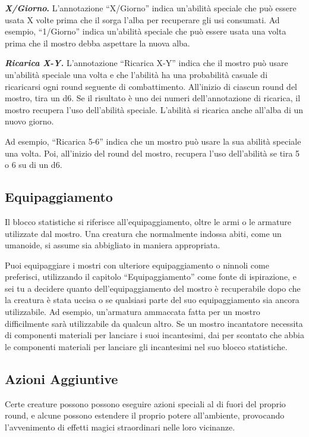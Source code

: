 \textbf{\emph{X/Giorno}.} L'annotazione ``X/Giorno'' indica un'abilità speciale che può essere usata X volte prima che il sorga l'alba per recuperare gli usi consumati. Ad esempio, ``1/Giorno'' indica un'abilità speciale che può essere usata una volta prima che il mostro debba aspettare la nuova alba.

\emph{\textbf{Ricarica X-Y.}} L'annotazione ``Ricarica X-Y'' indica che il mostro può usare un'abilità speciale una volta e che l'abilità ha una probabilità casuale di ricaricarsi ogni round seguente di combattimento. All'inizio di ciascun round del mostro, tira un d6. Se il risultato è uno dei numeri dell'annotazione di ricarica, il mostro recupera l'uso dell'abilità speciale. L'abilità si ricarica anche all'alba di un nuovo giorno.

Ad esempio, ``Ricarica 5-6'' indica che un mostro può usare la sua abilità speciale una volta. Poi, all'inizio del round del mostro, recupera l'uso dell'abilità se tira 5 o 6 su di un d6.

\subsection{Equipaggiamento}

Il blocco statistiche si riferisce all'equipaggiamento, oltre le armi o
le armature utilizzate dal mostro. Una creatura che normalmente indossa
abiti, come un umanoide, si assume sia abbigliato in maniera
appropriata.

Puoi equipaggiare i mostri con ulteriore equipaggiamento o ninnoli come
preferisci, utilizzando il capitolo ``Equipaggiamento'' come fonte di
ispirazione, e sei tu a decidere quanto dell'equipaggiamento del mostro
è recuperabile dopo che la creatura è stata uccisa o se qualsiasi parte
del suo equipaggiamento sia ancora utilizzabile. Ad esempio, un'armatura
ammaccata fatta per un mostro difficilmente sarà utilizzabile da qualcun altro.  Se un mostro incantatore necessita di componenti  materiali per lanciare i suoi incantesimi, dai per  scontato che abbia le componenti materiali per lanciare  gli incantesimi nel suo blocco statistiche.

\subsection{Azioni Aggiuntive}

Certe creature possono  possono eseguire azioni speciali al di fuori del proprio  round, e alcune possono estendere il proprio potere  all'ambiente, provocando l'avvenimento di effetti magici  straordinari nelle loro vicinanze.

